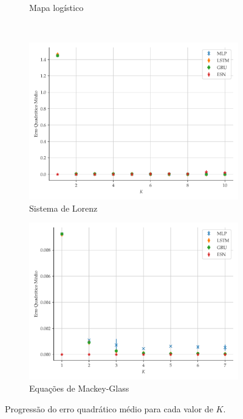 \documentclass[aspectratio=169]{beamer}
\begin{document}
\begin{frame}
\begin{figure}[H]
\begin{subfigure}[t]{0.4\textwidth}
         \caption{Mapa logístico}
     \end{subfigure}
     \centering
     \\
     \begin{subfigure}[t]{0.4\textwidth}
     \centering
         \includegraphics[scale=0.17]{progressao-k-lorenz.pdf}
         \caption{Sistema de Lorenz}
     \end{subfigure}
     \centering
     \begin{subfigure}[t]{0.4\textwidth} 
     \centering
         \includegraphics[scale=0.17]{progressao-k-mackeyglass.pdf}
         \caption{Equações de Mackey-Glass}
     \end{subfigure}  
     \centering   
     \caption{Progressão do erro quadrático médio para cada valor de $K$.}
     \label{fig:mse-progression}
\end{figure}
\end{frame}
\end{document}
